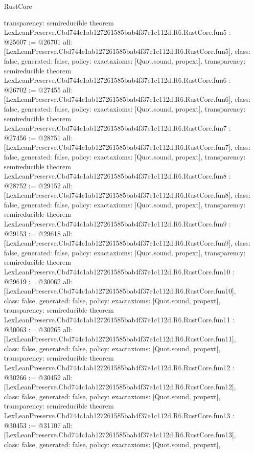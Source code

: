 \begin{lexlean}{RustCore}
\begin{coremodule}
{  transparency: semireducible
}
theorem LexLeanPreserve.Cbd744c1ab127261585bab4f37e1c112d.R6.RustCore.fun5 : @25607 := @26701 {
  all: [LexLeanPreserve.Cbd744c1ab127261585bab4f37e1c112d.R6.RustCore.fun5],
  class: false,
  generated: false,
  policy: exact{axioms: [Quot.sound, propext]},
  transparency: semireducible
}
theorem LexLeanPreserve.Cbd744c1ab127261585bab4f37e1c112d.R6.RustCore.fun6 : @26702 := @27455 {
  all: [LexLeanPreserve.Cbd744c1ab127261585bab4f37e1c112d.R6.RustCore.fun6],
  class: false,
  generated: false,
  policy: exact{axioms: [Quot.sound, propext]},
  transparency: semireducible
}
theorem LexLeanPreserve.Cbd744c1ab127261585bab4f37e1c112d.R6.RustCore.fun7 : @27456 := @28751 {
  all: [LexLeanPreserve.Cbd744c1ab127261585bab4f37e1c112d.R6.RustCore.fun7],
  class: false,
  generated: false,
  policy: exact{axioms: [Quot.sound, propext]},
  transparency: semireducible
}
theorem LexLeanPreserve.Cbd744c1ab127261585bab4f37e1c112d.R6.RustCore.fun8 : @28752 := @29152 {
  all: [LexLeanPreserve.Cbd744c1ab127261585bab4f37e1c112d.R6.RustCore.fun8],
  class: false,
  generated: false,
  policy: exact{axioms: [Quot.sound, propext]},
  transparency: semireducible
}
theorem LexLeanPreserve.Cbd744c1ab127261585bab4f37e1c112d.R6.RustCore.fun9 : @29153 := @29618 {
  all: [LexLeanPreserve.Cbd744c1ab127261585bab4f37e1c112d.R6.RustCore.fun9],
  class: false,
  generated: false,
  policy: exact{axioms: [Quot.sound, propext]},
  transparency: semireducible
}
theorem LexLeanPreserve.Cbd744c1ab127261585bab4f37e1c112d.R6.RustCore.fun10 : @29619 := @30062 {
  all: [LexLeanPreserve.Cbd744c1ab127261585bab4f37e1c112d.R6.RustCore.fun10],
  class: false,
  generated: false,
  policy: exact{axioms: [Quot.sound, propext]},
  transparency: semireducible
}
theorem LexLeanPreserve.Cbd744c1ab127261585bab4f37e1c112d.R6.RustCore.fun11 : @30063 := @30265 {
  all: [LexLeanPreserve.Cbd744c1ab127261585bab4f37e1c112d.R6.RustCore.fun11],
  class: false,
  generated: false,
  policy: exact{axioms: [Quot.sound, propext]},
  transparency: semireducible
}
theorem LexLeanPreserve.Cbd744c1ab127261585bab4f37e1c112d.R6.RustCore.fun12 : @30266 := @30452 {
  all: [LexLeanPreserve.Cbd744c1ab127261585bab4f37e1c112d.R6.RustCore.fun12],
  class: false,
  generated: false,
  policy: exact{axioms: [Quot.sound, propext]},
  transparency: semireducible
}
theorem LexLeanPreserve.Cbd744c1ab127261585bab4f37e1c112d.R6.RustCore.fun13 : @30453 := @31107 {
  all: [LexLeanPreserve.Cbd744c1ab127261585bab4f37e1c112d.R6.RustCore.fun13],
  class: false,
  generated: false,
  policy: exact{axioms: [Quot.sound, propext]},
}
\end{coremodule}
\end{lexlean}
